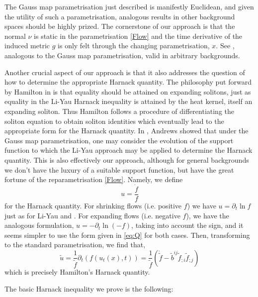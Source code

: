 The Gauss map parametrisation just described is manifestly Euclidean, and given the utility of such a parametrisation, analogous results in other background spaces should be highly prized. The cornerstone of our approach is that the normal \(\nu\) is static in the parametrisation \eqref{Flow} and the time derivative of the induced metric \(g\) is only felt through the changing parametrisation, $x$. See , analogous to the Gauss map parametrisation, valid in arbitrary backgrounds.

Another crucial aspect of our approach is that it also addresses the question of how to determine the appropriate Harnack quantity. The philosophy put forward by Hamilton in \cite{Hamilton:/1995,Hamilton:/1993} is that equality should be attained on expanding solitons, just as equality in the Li-Yau Harnack inequality \cite{LiYau:/1986} is attained by the heat kernel, itself an expanding soliton. Thus Hamilton follows a procedure of differentiating the soliton equation to obtain soliton identities which eventually lead to the appropriate form for the Harnack quantity. In \cite{Andrews:09/1994}, Andrews showed that under the Gauss map parametrisation, one may consider the evolution of the support function to which the Li-Yau approach may be applied to determine the Harnack quantity. This is also effectively our approach, although for general backgrounds we don't have the luxury of a suitable support function, but have the great fortune of the reparametrisation \eqref{Flow}. Namely, we define
\begin{equation}
\label{eq:Q}
u = \frac{\dot{f}}{f}
\end{equation}
for the Harnack quantity. For shrinking flows (i.e. positive $f$) we have $u = \partial_t \ln f$ just as for Li-Yau \cite{LiYau:/1986} and \cite{Andrews:09/1994}. For expanding flows (i.e. negative $f$), we have the analogous formulation, $u = - \partial_t \ln (-f)$, taking into account the sign, and it seems simpler to use the form given in \eqref{eq:Q} for both cases. Then, transforming to the standard parametrisation, we find that,
\[
\tilde{u} = \frac{1}{\tilde{f}} \partial_t \left(f(u_t(x), t)\right) = \frac{1}{\tilde{f}} \left(\dot{\tilde{f}} - \tilde{b}^{ij} \tilde{f}_{;i} \tilde{f}_{;j}\right)
\]
which is precisely Hamilton's Harnack quantity.

The basic Harnack inequality we prove is the following:


